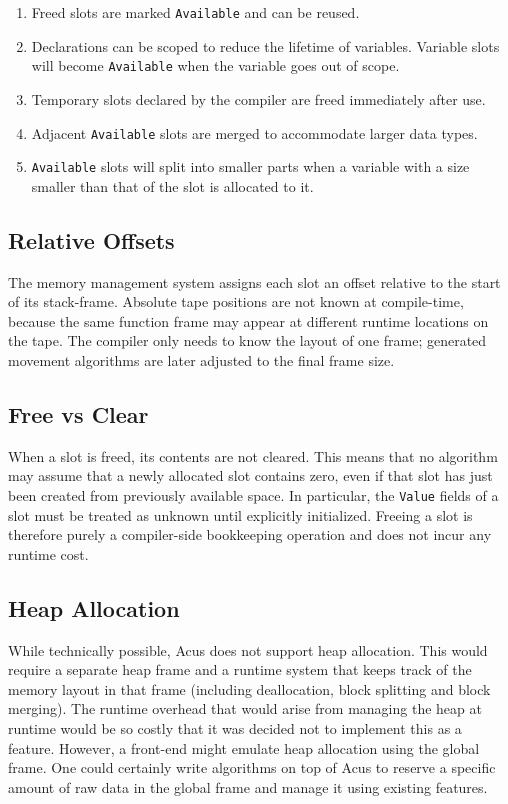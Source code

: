 \begin{enumerate}\itemsep0em
\item Freed slots are marked \texttt{Available} and can be reused.
\item Declarations can be scoped to reduce the lifetime of variables. Variable slots will become \texttt{Available} when the variable goes out of scope.
\item Temporary slots declared by the compiler are freed immediately after use.
\item Adjacent \texttt{Available} slots are merged to accommodate larger data types.
\item \texttt{Available} slots will split into smaller parts when a variable with a size smaller than that of the slot is allocated to it.
\end{enumerate}

\subsection{Relative Offsets}
The memory management system assigns each slot an offset relative to the start of its stack-frame. Absolute tape positions are not known at compile-time, because the same function frame may appear at different runtime locations on the tape. The compiler only needs to know the layout of one frame; generated movement algorithms are later adjusted to the final frame size.

\subsection{Free vs Clear}
When a slot is freed, its contents are not cleared. This means that no algorithm may assume that a newly allocated slot contains zero, even if that slot has just been created from previously available space. In particular, the \texttt{Value} fields of a slot must be treated as unknown until explicitly initialized. Freeing a slot is therefore purely a compiler-side bookkeeping operation and does not incur any runtime cost.

\subsection{Heap Allocation}
While technically possible, Acus does not support heap allocation. This would require a separate heap frame and a runtime system that keeps track of the memory layout in that frame (including deallocation, block splitting and block merging). The runtime overhead that would arise from managing the heap at runtime would be so costly that it was decided not to implement this as a feature. However, a front-end might emulate heap allocation using the global frame. One could certainly write algorithms on top of Acus to reserve a specific amount of raw data in the global frame and manage it using existing features.

